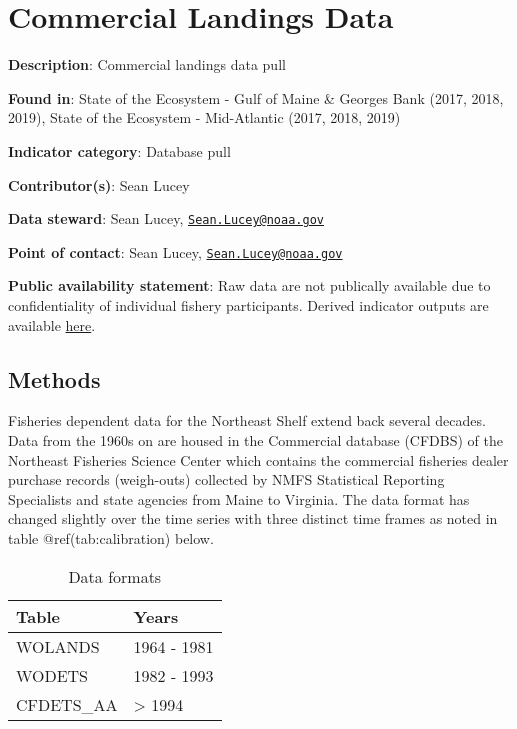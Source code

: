 \documentclass[]{article}
\title{}
\author{}
\date{}
\begin{document}
\section{Commercial Landings Data}\label{comdat}

\textbf{Description}: Commercial landings data pull

\textbf{Found in}: State of the Ecosystem - Gulf of Maine \& Georges
Bank (2017, 2018, 2019), State of the Ecosystem - Mid-Atlantic (2017,
2018, 2019)

\textbf{Indicator category}: Database pull

\textbf{Contributor(s)}: Sean Lucey

\textbf{Data steward}: Sean Lucey,
\href{mailto:Sean.Lucey@noaa.gov}{\nolinkurl{Sean.Lucey@noaa.gov}}

\textbf{Point of contact}: Sean Lucey,
\href{mailto:Sean.Lucey@noaa.gov}{\nolinkurl{Sean.Lucey@noaa.gov}}

\textbf{Public availability statement}: Raw data are not publically
available due to confidentiality of individual fishery participants.
Derived indicator outputs are available
\href{https://comet.nefsc.noaa.gov/erddap/tabledap/group_landings_soe_v1.html}{here}.

\subsection{Methods}\label{methods}

Fisheries dependent data for the Northeast Shelf extend back several
decades. Data from the 1960s on are housed in the Commercial database
(CFDBS) of the Northeast Fisheries Science Center which contains the
commercial fisheries dealer purchase records (weigh-outs) collected by
NMFS Statistical Reporting Specialists and state agencies from Maine to
Virginia. The data format has changed slightly over the time series with
three distinct time frames as noted in table @ref(tab:calibration)
below.

\begin{table}[t]

\caption{\label{tab:unnamed-chunk-2}Data formats}
\centering
\begin{tabular}{l|l}
\hline
Table & Years\\
\hline
WOLANDS & 1964 - 1981\\
\hline
WODETS & 1982 - 1993\\
\hline
CFDETS\_AA & > 1994\\
\hline
\end{tabular}
\end{table}
\end{document}
